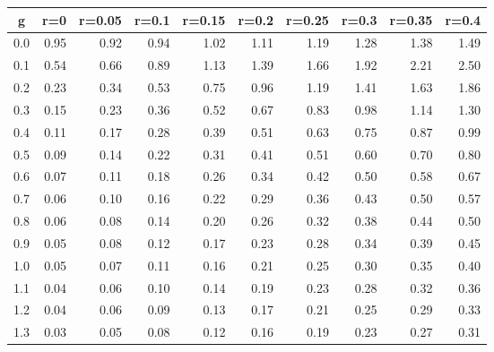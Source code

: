%
\begin{table}[!tbp]
 \begin{center}
 \begin{tabular}{rrrrrrrrrr}\hline\hline
\multicolumn{1}{c}{g}&\multicolumn{1}{c}{r=0}&\multicolumn{1}{c}{r=0.05}&\multicolumn{1}{c}{r=0.1}&\multicolumn{1}{c}{r=0.15}&\multicolumn{1}{c}{r=0.2}&\multicolumn{1}{c}{r=0.25}&\multicolumn{1}{c}{r=0.3}&\multicolumn{1}{c}{r=0.35}&\multicolumn{1}{c}{r=0.4}\tabularnewline
\hline
0.0&0.95&0.92&0.94&1.02&1.11&1.19&1.28&1.38&1.49\tabularnewline
0.1&0.54&0.66&0.89&1.13&1.39&1.66&1.92&2.21&2.50\tabularnewline
0.2&0.23&0.34&0.53&0.75&0.96&1.19&1.41&1.63&1.86\tabularnewline
0.3&0.15&0.23&0.36&0.52&0.67&0.83&0.98&1.14&1.30\tabularnewline
0.4&0.11&0.17&0.28&0.39&0.51&0.63&0.75&0.87&0.99\tabularnewline
0.5&0.09&0.14&0.22&0.31&0.41&0.51&0.60&0.70&0.80\tabularnewline
0.6&0.07&0.11&0.18&0.26&0.34&0.42&0.50&0.58&0.67\tabularnewline
0.7&0.06&0.10&0.16&0.22&0.29&0.36&0.43&0.50&0.57\tabularnewline
0.8&0.06&0.08&0.14&0.20&0.26&0.32&0.38&0.44&0.50\tabularnewline
0.9&0.05&0.08&0.12&0.17&0.23&0.28&0.34&0.39&0.45\tabularnewline
1.0&0.05&0.07&0.11&0.16&0.21&0.25&0.30&0.35&0.40\tabularnewline
1.1&0.04&0.06&0.10&0.14&0.19&0.23&0.28&0.32&0.36\tabularnewline
1.2&0.04&0.06&0.09&0.13&0.17&0.21&0.25&0.29&0.33\tabularnewline
1.3&0.03&0.05&0.08&0.12&0.16&0.19&0.23&0.27&0.31\tabularnewline
\hline
\end{tabular}

\end{center}

\end{table}

